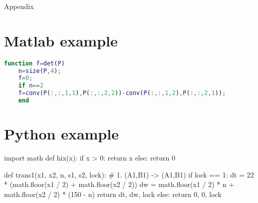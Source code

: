 \appendix
\newpage
\vspace*{-21.6pt}
	
\begin{center}
	\Large\englishbf
	Appendix
\end{center}

\section{Matlab example}
\label{matlab}

\begin{lstlisting}[language=Matlab]
	function f=det(P)
	n=size(P,4);
	f=0;
	if n==2  
	f=conv(P(:,:,1,1),P(:,:,2,2))-conv(P(:,:,1,2),P(:,:,2,1));   
	end
\end{lstlisting}


\section{Python example}
\label{python}
\begin{python}
	import math
	def hix(x):
	if x > 0:
	return x
	else:
	return 0
	
	def trans1(x1, x2, n, s1, s2, lock):
	# 1.	(A1,B1) -> (A1,B1)
	if lock == 1:
	dt = 22 * (math.floor(x1 / 2) + math.floor(x2 / 2))
	dw = math.floor(x1 / 2) * n + math.floor(x2 / 2) * (150 - n)
	return dt, dw, lock
	else:
	return 0, 0, lock
\end{python}
